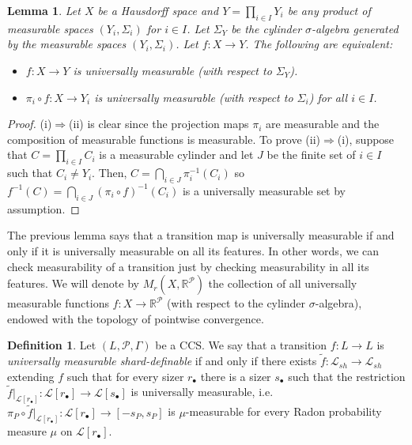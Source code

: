 \documentclass[psamsfonts]{amsart}
\newtheorem{lem}[thm]{Lemma}
\theoremstyle{definition}
\newtheorem{defn}[thm]{Definition}
\theoremstyle{remark}
\numberwithin{equation}{section}
\begin{document}
\begin{lem}
    Let $X$ be a Hausdorff space and $Y=\prod_{i\in I}Y_i$ be any product of measurable spaces $(Y_i,\Sigma_i)$ for $i\in I$. Let $\Sigma_Y$ be the cylinder $\sigma$-algebra generated by the measurable spaces $(Y_i,\Sigma_i)$. Let $f:X\rightarrow Y$. The following are equivalent:
    \begin{itemize}
        \item [(i)] $f:X\rightarrow Y$ is universally measurable (with respect to $\Sigma_Y$).
        \item [(ii)] $\pi_i\circ f:X\rightarrow Y_i$ is universally measurable (with respect to $\Sigma_i$) for all $i\in I$.
    \end{itemize}
\end{lem}

\begin{proof}
    (i)$\Rightarrow$(ii) is clear since the projection maps $\pi_i$ are measurable and the composition of measurable functions is measurable. To prove (ii)$\Rightarrow$(i), suppose that $C=\prod_{i\in I}C_i$ is a measurable cylinder and let $J$ be the finite set of $i\in I$ such that $C_i\neq Y_i$. Then, $C=\bigcap_{i\in J}\pi_i^{-1}(C_i)$ so $f^{-1}(C)=\bigcap_{i\in J}(\pi_i\circ f)^{-1}(C_i)$ is a universally measurable set by assumption.
\end{proof}

The previous lemma says that a transition map is universally measurable if and only if it is universally measurable on all its features. In other words, we can check measurability of a transition just by checking measurability in all its features. We will denote by $M_r(X,\mathbb{R}^\mathcal{P})$ the collection of all universally measurable functions $f:X\rightarrow\mathbb{R}^\mathcal{P}$ (with respect to the cylinder $\sigma$-algebra), endowed with the topology of pointwise convergence.

\begin{defn}
    Let $(L,\mathcal P,\Gamma)$ be a CCS. We say that a transition $f:L\rightarrow L$ is \emph{universally measurable shard-definable} if and only if there exists $\tilde f:\mathcal{L}_{sh}\rightarrow \mathcal{L}_{sh}$ extending $f$ such that for every sizer $r_\bullet$ there is a sizer $s_\bullet$ such that the restriction $\tilde f|_{\mathcal{L}[r_{\bullet}]}:\mathcal{L}[r_\bullet]\rightarrow\mathcal{L}[s_\bullet]$ is universally measurable, i.e. $\pi_P\circ \tilde f|_{\mathcal{L}[r_{\bullet}]}:\mathcal{L}[r_\bullet]\rightarrow [-s_P,s_P]$ is $\mu$-measurable for every Radon probability measure $\mu$ on $\mathcal{L}[r_\bullet]$.
\end{defn}
\end{document}
